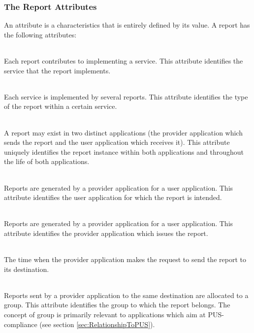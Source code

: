 \subsubsection{The Report Attributes}\label{sec:RepAttributes}

An attribute is a characteristics that is entirely defined by its value. A report has the following attributes:

\begin{fw_description}
\item[Service Type]\hfill\\
Each report contributes to implementing a service. This attribute identifies the service that the report implements. 
\item[Report Sub-Type]\hfill\\
Each service is implemented by several reports. This attribute identifies the type of the report within a certain service. 
\item[Report Identifier]\hfill\\
A report may exist in two distinct applications (the provider application which sends the report and the user application which receives it). This attribute uniquely identifies the report instance within both applications and throughout the life of both applications.
\item[Destination]\hfill\\
Reports are generated by a provider application for a user application. This attribute identifies the user application for which the report is intended.
\item[Source]\hfill\\
Reports are generated by a provider application for a user application. This attribute identifies the provider application which issues the report.
\item[Time Stamp]\hfill\\
The time when the provider application makes the request to send the report to its destination.
\item[Group]\hfill\\
Reports sent by a provider application to the same destination are allocated to a group. This attribute identifies the group to which the report belongs. The concept of group is primarily relevant to applications which aim at PUS-compliance (see section \ref{sec:RelationshipToPUS}).  
\item[Sequence Counter]\hfill\\

\end{fw_description}
